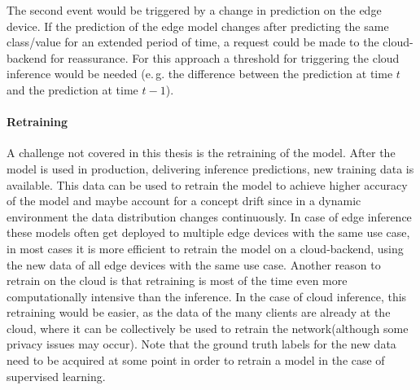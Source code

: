 The second event would be triggered by a change in prediction on the edge device. If the prediction of the edge model changes after predicting the same class/value for an extended period of time, a request could be made to the cloud-backend for reassurance. For this approach a threshold for triggering the cloud inference would be needed (e.\,g. the difference between the prediction at time $t$ and the prediction at time $t-1$).



\paragraph{Retraining}
A challenge not covered in this thesis is the retraining of the model. After the model is used in production, delivering inference predictions, new training data is available. This data can be used to retrain the model to achieve higher accuracy of the model and maybe account for a concept drift since in a dynamic environment the data distribution changes continuously.
In case of edge inference these models often get deployed to multiple edge devices with the same use case, in most cases it is more efficient to retrain the model on a cloud-backend, using the new data of all edge devices with the same use case. Another reason to retrain on the cloud is that retraining is most of the time even more computationally intensive than the inference.
In the case of cloud inference, this retraining would be easier, as the data of the many clients are already at the cloud, where it can be collectively be used to retrain the network(although some privacy issues may occur).
Note that the ground truth labels for the new data need to be acquired at some point in order to retrain a model in the case of supervised learning.
\endinput 
